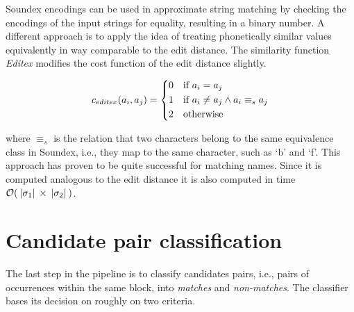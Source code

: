 Soundex encodings can be used in approximate string matching by checking the encodings of the input strings for equality, resulting in a binary number.
A different approach is to apply the idea of treating phonetically similar values equivalently in way comparable to the edit distance.
The similarity function \emph{Editex} modifies the cost function of the edit distance slightly.

\begin{equation}
    c_{editex}(a_i, a_j) =
    \begin{dcases}
        0 & \text{if } a_i = a_j \\
        1 & \text{if } a_i \neq a_j \wedge a_i \equiv_s a_j \\
        2 & \text{otherwise}
    \end{dcases}
\end{equation}

\noindent where $\equiv_s$ is the relation that two characters belong to the same equivalence class in Soundex, i.e., they map to the same character, such as `b' and `f'.
This approach has proven to be quite successful for matching names\citep{Zobel1996}.
Since it is computed analogous to the edit distance it is also computed in time $\mathcal{O}(\:\vert {\sigma_1} \vert\: \times \:\vert {\sigma_2} \vert\:)$.




\section{Candidate pair classification}
\label{sec:classification}

The last step in the pipeline is to classify candidates pairs, i.e., pairs of occurrences within the same block, into \emph{matches} and \emph{non-matches}.
The classifier bases its decision on roughly on two criteria.

